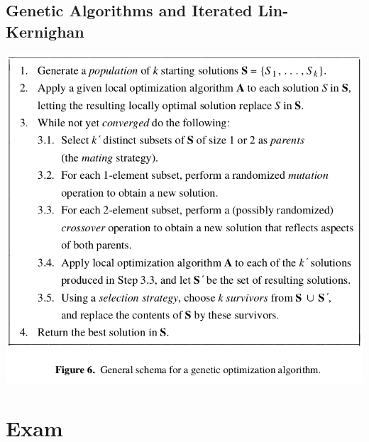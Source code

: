 \documentclass[11pt]{article}
\begin{document}
\subsection{Genetic Algorithms and Iterated Lin-Kernighan}
\label{sec:orgcb2c09c}
\begin{center}
\includegraphics[width=.9\linewidth]{TSP Problem (local optimization)/screenshot_2019-05-14_14-20-01.png}
\end{center}

\section{Exam}
\label{sec:orgf4b126f}
\end{document}
